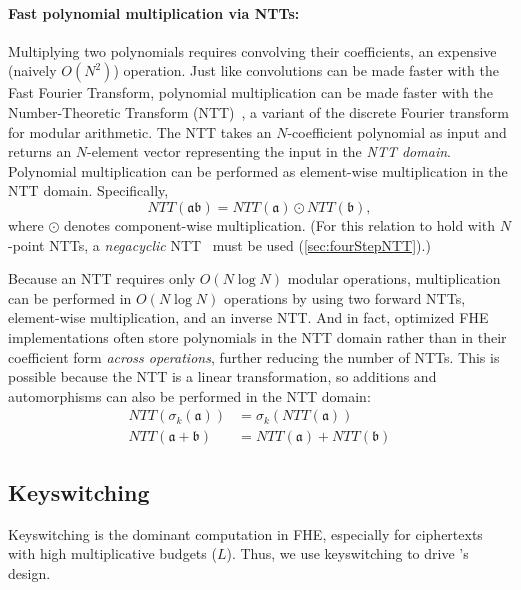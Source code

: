 \paragraph{Fast polynomial multiplication via NTTs:}
Multiplying two polynomials requires convolving their coefficients, an
expensive (naively $O(N^2)$) operation.
Just like convolutions can be made faster with the Fast Fourier Transform,
polynomial multiplication can be made faster with the Number-Theoretic Transform (NTT)~\cite{moenck1976practical},  %
a variant of the discrete Fourier transform for modular arithmetic.
The NTT takes an $N$\hyp{}coefficient polynomial as input and returns an $N$\hyp{}element vector representing the input in the
\textit{NTT domain}. Polynomial multiplication can be performed as element-wise multiplication in the NTT domain. Specifically,
\begin{equation*}
    NTT(\mathfrak{a}\mathfrak{b}) = NTT(\mathfrak{a}) \odot NTT(\mathfrak{b}),
\end{equation*}
where $\odot$ denotes component-wise multiplication. 
(For this relation to hold with $N$\hyp{}point NTTs, a \emph{negacyclic} NTT~\cite{lyubashevsky:tact10:ideal} must be used (\autoref{sec:fourStepNTT}).)

Because an NTT requires only $O(N \log N)$ modular operations, 
multiplication can be performed in $O(N \log N)$ operations by using two forward NTTs,
element-wise multiplication, and an inverse NTT.
And in fact, optimized FHE implementations often store polynomials in the NTT domain
rather than in their coefficient form \emph{across operations}, further reducing the number of NTTs.
This is possible because the NTT is a linear transformation, so additions and automorphisms can also be performed in the NTT domain:
\vspace{-0.05in} %
\begin{align*}
    NTT(\sigma_k(\mathfrak{a})) &= \sigma_k(NTT(\mathfrak{a})) \\
    NTT(\mathfrak{a} + \mathfrak{b}) &= NTT(\mathfrak{a}) + NTT(\mathfrak{b})
\end{align*}
\vspace{-0.2in}

\subsection{Keyswitching}\label{sec:keyswitching}

Keyswitching is the dominant computation in FHE, especially for ciphertexts 
with high multiplicative budgets ($L$).
Thus, we use keyswitching to drive \name's design.


